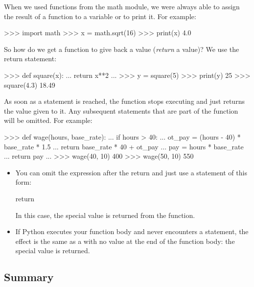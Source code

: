 \documentclass[11pt]{cselabheader}
\begin{document}
{When we used functions from the math module, we were always able to assign the
result of a function to a variable or to print it. For example:

\begin{pyconcode}
>>> import math
>>> x = math.sqrt(16)
>>> print(x)
4.0
\end{pyconcode}

So how do we get a function to give back a value (\emph{return} a value)? We use
the return statement:

\begin{pyconcode}
>>> def square(x):
...     return x**2
...
>>> y = square(5)
>>> print(y)
25
>>> square(4.3)
18.49
\end{pyconcode}

As soon as a  statement is reached, the function stops
executing and just returns the value given to it. Any subsequent statements that
are part of the function will be omitted. For example:

\begin{pyconcode}
>>> def wage(hours, base_rate):
...     if hours > 40:
...         ot_pay = (hours - 40) * base_rate * 1.5
...         return base_rate * 40 + ot_pay
...     pay = hours * base_rate
...     return pay
...
>>> wage(40, 10)
400
>>> wage(50, 10)
550
\end{pyconcode}

\begin{itemize}
  \item You can omit the expression after the return and just use a statement of
    this form:

    \begin{python3code}
return
    \end{python3code}

    In this case, the special value  is returned from the
    function.

  \item If Python executes your function body and never encounters a
     statement, the effect is the same as a
     with no value at the end of the function body: the
    special value  is returned.
\end{itemize}

\subsection{Summary}
\label{subsec:funcs.sum}

}
\end{document}
